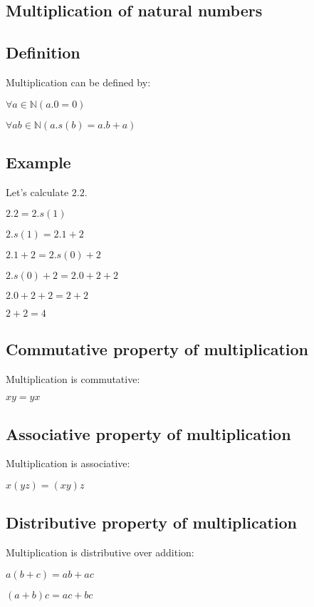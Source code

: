 \subsection{Multiplication of natural numbers}


\subsection{Definition}

Multiplication can be defined by:

\(\forall a \in \mathbb{N} (a.0=0)\)

\(\forall a b \in \mathbb{N} (a.s(b)=a.b+a)\)

\subsection{Example}

Let’s calculate \(2.2\).

\(2.2=2.s(1)\)

\(2.s(1)=2.1+2\)

\(2.1+2=2.s(0)+2\)

\(2.s(0)+2=2.0+2+2\)

\(2.0+2+2=2+2\)

\(2+2=4\)

\subsection{Commutative property of multiplication}

Multiplication is commutative:

\(xy=yx\)

\subsection{Associative property of multiplication}

Multiplication is associative:

\(x(yz)=(xy)z\)

\subsection{Distributive property of multiplication}

Multiplication is distributive over addition:

\(a(b+c)=ab+ac\)

\((a+b)c=ac+bc\)



